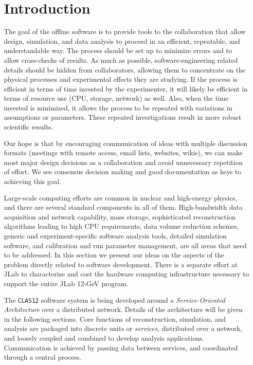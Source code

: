 \section{Introduction}

The goal of the offline software is to provide tools to the collaboration 
that allow design, simulation, and data analysis to proceed in an efficient, 
repeatable, and understandable way.  The process should be set up to minimize 
errors and to allow cross-checks of results.  As much as possible, 
software-engineering related details should be hidden from collaborators,
allowing them to concentrate on the physical processes and experimental 
effects they are studying.  If the process is efficient in terms of time 
invested by the experimenter, it will likely be efficient in terms of 
resource use (CPU, storage, network) as well.  Also, when the time invested 
is minimized, it allows the process to be repeated with variations in 
assumptions or parameters. These repeated investigations result in more 
robust scientific results.

Our hope is that by encouraging communication of ideas with multiple 
discussion formats (meetings with remote access, email lists, websites, 
wikis), we can make most major design decisions as a collaboration and avoid 
unnecessary repetition of effort.  We see consensus decision making and good 
documentation as keys to achieving this goal.

Large-scale computing efforts are common in nuclear and high-energy physics, 
and there are several standard components in all of them.  High-bandwidth data 
acquisition and network capability, mass storage, sophisticated reconstruction 
algorithms leading to high CPU requirements, data volume reduction schemes, 
generic and experiment-specific software analysis tools, detailed simulation 
software, and calibration and run parameter management, are all areas that 
need to be addressed.  In this section we present our ideas on the aspects of 
the problem directly related to software development.  There is a separate 
effort at JLab to characterize and cost the hardware computing 
infrastructure necessary to support the entire JLab 12-GeV program.

The {\tt CLAS12} software system is being developed around a 
{\it Service-Oriented Architecture} over a distributed network.  Details of 
the architecture will be given in the following sections.  Core functions of 
reconstruction, simulation, and analysis are packaged into discrete units or 
{\it services}, distributed over a network, and loosely coupled and combined 
to develop analysis applications.  Communication is achieved by passing data 
between services, and coordinated through a central process.

